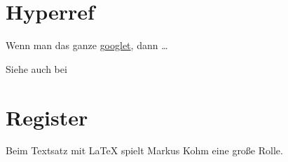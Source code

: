 \documentclass[
    fontsize=11pt,%
    paper=a4,%
    headings=small,
    parskip=half-,
    listof=totoc,
    bibliography=totoc,
    cleardoublepage=empty,
    pagesize
]{scrbook}
\theoremstyle{break}
\theoremstyle{plain}
\begin{document}
\chapter{Hyperref}
Wenn man das ganze \href{www.google.de}{googlet}, dann \dots

Siehe auch bei \cite{Mittelbach.2004}


\chapter{Register}
Beim Textsatz mit \LaTeX{} spielt Markus Kohm eine große Rolle.

\nocite{*}
\printbibliography[nottype=online]
\printbibliography[type=online]

\printindex
\printindex[personen]
\end{document}
